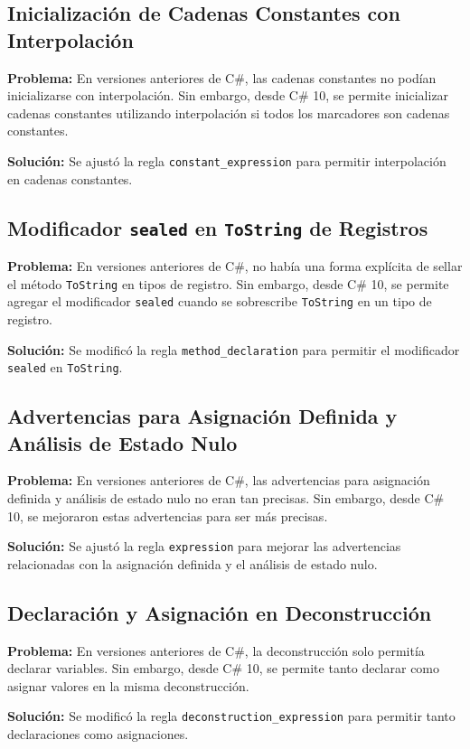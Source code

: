 \subsection{Inicialización de Cadenas Constantes con Interpolación}
\textbf{Problema:} En versiones anteriores de C\#, las cadenas constantes no podían inicializarse con interpolación. Sin embargo, desde C\# 10, se permite inicializar cadenas constantes utilizando interpolación si todos los marcadores son cadenas constantes.

\textbf{Solución:} Se ajustó la regla \texttt{constant\_expression} para permitir interpolación en cadenas constantes.

\subsection{Modificador \texttt{sealed} en \texttt{ToString} de Registros}
\textbf{Problema:} En versiones anteriores de C\#, no había una forma explícita de sellar el método \texttt{ToString} en tipos de registro. Sin embargo, desde C\# 10, se permite agregar el modificador \texttt{sealed} cuando se sobrescribe \texttt{ToString} en un tipo de registro.

\textbf{Solución:} Se modificó la regla \texttt{method\_declaration} para permitir el modificador \texttt{sealed} en \texttt{ToString}.

\subsection{Advertencias para Asignación Definida y Análisis de Estado Nulo}
\textbf{Problema:} En versiones anteriores de C\#, las advertencias para asignación definida y análisis de estado nulo no eran tan precisas. Sin embargo, desde C\# 10, se mejoraron estas advertencias para ser más precisas.

\textbf{Solución:} Se ajustó la regla \texttt{expression} para mejorar las advertencias relacionadas con la asignación definida y el análisis de estado nulo.

\subsection{Declaración y Asignación en Deconstrucción}
\textbf{Problema:} En versiones anteriores de C\#, la deconstrucción solo permitía declarar variables. Sin embargo, desde C\# 10, se permite tanto declarar como asignar valores en la misma deconstrucción.

\textbf{Solución:} Se modificó la regla \texttt{deconstruction\_expression} para permitir tanto declaraciones como asignaciones.

